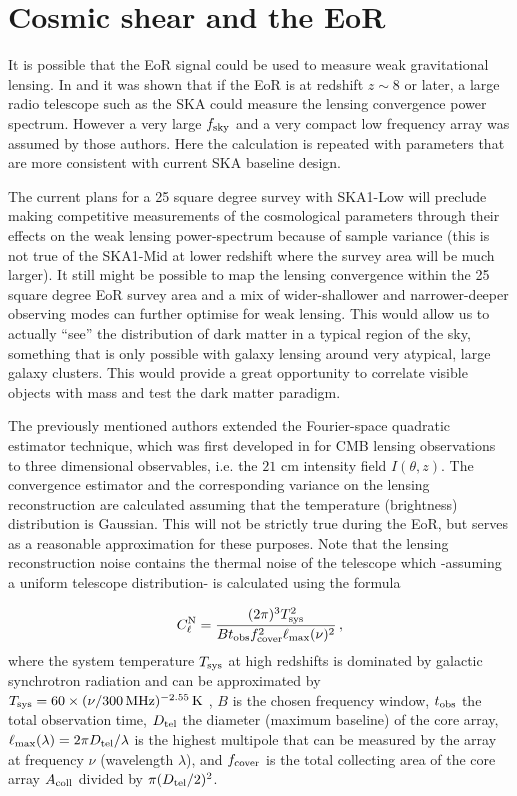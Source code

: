 \documentclass{PoS}
\begin{document}
\section{Cosmic shear and the EoR}
It is possible that the EoR signal could be used to measure weak gravitational lensing.
In \cite{Zahn:2005ap} and \cite{Metcalf:2009}  it was shown that if the EoR is at redshift 
$z \sim 8$ or later, a large radio telescope such as the SKA could measure the lensing convergence power spectrum.  However a very large $f_{\rm sky}$ and a very compact low frequency array was assumed by those authors.  Here the calculation is repeated with parameters that are more consistent with current SKA baseline design.  

The current plans for a 25 square degree survey with SKA1-Low will preclude making competitive measurements of the cosmological parameters through their effects on the weak lensing power-spectrum because of sample variance (this is not true of the SKA1-Mid at lower redshift where the survey area will be much larger).  It still might be possible to map the lensing convergence within the 25 square degree EoR survey area and a mix of wider-shallower and narrower-deeper observing modes can further optimise for weak lensing.  This would allow us to actually ``see'' the distribution of dark matter in a typical region of the sky, something that is only possible with galaxy lensing around very atypical, large galaxy clusters.  This would provide a great opportunity to correlate visible objects with mass and test the dark matter paradigm.

The previously mentioned authors extended the
Fourier-space quadratic estimator technique, which was first developed in 
\cite{Hu:2001tn} for CMB lensing  observations to three dimensional
observables, i.e. the $21$ cm intensity field $I(\theta,z)$.  
The  convergence
estimator and the corresponding variance on the lensing reconstruction are
calculated assuming that the temperature (brightness) distribution is
Gaussian. This will not be strictly true during the EoR, but serves as a reasonable approximation for these purposes. Note that the lensing reconstruction noise contains the thermal noise of the telescope which -assuming a uniform telescope distribution- is calculated using the formula

\begin{equation}
C^{\rm N}_\ell = \frac{(2\pi)^3 T^2_{\rm sys}}{B t_{\rm obs} f^2_{\rm cover} \ell_{\rm max}(\nu)^2} \, ,
\end{equation} where the system temperature $T_{\rm sys}$ at high redshifts
 is dominated by galactic synchrotron radiation and can be approximated by $T_{\rm sys} = 60 \times (\nu/300 \, {\rm MHz})^{-2.55} \, {\rm K}$ \citep{Dewdney:2013}, $B$ is the chosen frequency window, $t_{\rm obs}$ the total observation time, $D_{\rm tel}$ the diameter (maximum baseline) of the core array, $\ell_{\rm max}(\lambda)=2\pi D_{\rm tel}/\lambda$ is the highest multipole that can be measured by the array at frequency $\nu$ (wavelength $\lambda$), and $f_{\rm cover}$ is the total collecting area of the core array $A_{\rm coll}$ divided by $\pi(D_{\rm tel}/2)^2$. 
 
\end{document}
